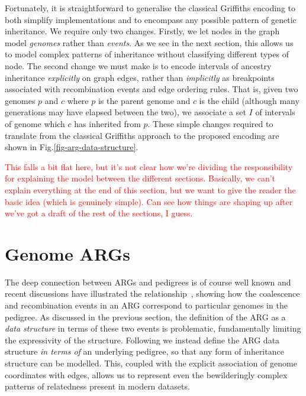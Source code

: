 \documentclass{article}
\begin{document}
Fortunately, it is straightforward to generalise the classical Griffiths
encoding to both simplify implementations and to encompass any
possible pattern of genetic inheritance.
We require only two changes. Firstly, we let nodes in the
graph model \emph{genomes} rather than \emph{events}. As we
see in the next section, this allows us to model complex
patterns of inheritance without classifying different types of node.
The second change we must make is to encode
intervals of ancestry inheritance \emph{explicitly} on graph edges,
rather than \emph{implicitly} as breakpoints associated with
recombination events and edge ordering rules.
That is, given two genomes $p$
and $c$ where $p$ is the parent genome and $c$ is the child
(although many generations may have elapsed between the two),
we associate a set $I$ of intervals of genome which $c$ has
inherited from $p$.
These simple changes required to translate from the
classical Griffiths approach to the proposed encoding
are shown in Fig.\ref{fig-arg-data-structure}.

\textcolor{red}{
This falls a bit flat here,  but it's not clear how we're dividing
the responsibility for explaining the model between the
different sections.
Basically, we can't explain everything at
the end of this section, but we want to give the reader the
basic idea (which is genuinely simple). Can see how things are
shaping up after we've got a draft of the rest of the
sections, I guess.}

\section*{Genome ARGs}

The deep connection between ARGs and pedigrees is of course
well known
\citep[e.g.][]{wakeley2012genetics,gusfield2014recombinatorics,
speed2015naturereviewsgenetics}
and recent discussions have illustrated the
relationship~\citep{mathieson2020ancestry,brandt2021evaluation}, %
showing how the coalescence and recombination events in an ARG
correspond to particular genomes in the pedigree.
As discussed in the previous section, the definition of the ARG
as a \emph{data structure} in terms of these two events is problematic,
fundamentally limiting the expressivity of the structure.
Following \cite{mathieson2020ancestry} we instead define the
ARG data structure \emph{in terms of} an underlying pedigree, so that
any form of inheritance structure can be modelled.
This, coupled with
the explicit association of genome coordinates with edges, allows
us to represent even the bewilderingly complex patterns of relatedness
present in modern datasets.
\end{document}
